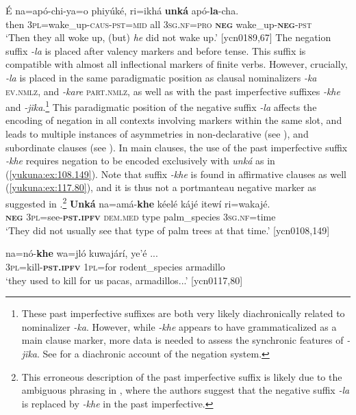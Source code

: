 \documentclass[output=paper,colorlinks,citecolor=brown]{langscibook}
\begin{document}
\ea\label{yukuna:ex:189.67a}
\gll  É na=apó-chi-ya=o phiyúké, ri=ikhá \textbf{unká} apó-\textbf{la}-cha. \\
then \textsc{3pl}=wake\_up-\textsc{caus}-\textsc{pst}=\textsc{mid} all \textsc{3sg.nf}=\textsc{pro} \textbf{\textsc{neg}} wake\_up-\textbf{\textsc{neg}}-\textsc{pst}\\
\glt ‘Then they all woke up, (but) \textit{he} did not wake up.’ [ycn0189,67]
\z
The negation suffix \textit{-la} is placed after valency markers and before tense. This suffix is compatible with almost all inflectional markers of finite verbs. However, crucially, \textit{-la} is placed in the same paradigmatic position as clausal nominalizers \textit{-ka} \textsc{ev.nmlz}, and \textit{-kare} \textsc{part.nmlz}, as well as with the past imperfective suffixes \textit{-khe} and \textit{-jĩka}.\footnote{These past imperfective suffixes are both very likely diachronically related to nominalizer \textit{-ka}. However, while \textit{-khe} appears to have grammaticalized as a main clause marker, more data is needed to assess the synchronic features of \textit{-jĩka}. See  for a diachronic account of the negation system.} This paradigmatic position of the negative suffix \textit{-la} affects the encoding of negation in all contexts involving markers within the same slot, and leads to multiple instances of asymmetries in non-declarative (see ), and subordinate clauses (see ). In main clauses, the use of the past imperfective suffix \textit{-khe} requires negation to be encoded exclusively with \textit{unká} as in (\ref{yukuna:ex:108.149}). Note that suffix \textit{-khe} is found in affirmative clauses as well (\ref{yukuna:ex:117.80}), and it is thus not a portmanteau negative marker as suggested in \citet[]{Michael2014}.\footnote{This erroneous description of the past imperfective suffix is likely due to the ambiguous phrasing in \citet[314]{SchauerEtAl2005}, where the authors suggest that the negative suffix \textit{-la} is replaced by \textit{-khe} in the past imperfective.}
\ea\label{yukuna:ex:108.149}
\gll  \textbf{Unká} na=amá-\textbf{khe} kéelé kájé itewí ri=wakajé.  \\
\textbf{\textsc{neg}} \textsc{3pl}=see-\textbf{\textsc{pst.ipfv}} \textsc{dem.med} type palm\_species \textsc{3sg.nf}=time\\ 
\glt ‘They did not usually see that type of palm trees at that time.’ [ycn0108,149]
\z

\ea\label{yukuna:ex:117.80}
\gll  na=nó-\textbf{khe} wa=jló kuwajárí,  ye'é {...} \\
\textsc{3pl}=kill-\textbf{\textsc{pst.ipfv}} \textsc{1pl}=for rodent\_species armadillo\\ 
\glt ‘they used to kill for us pacas, armadillos{...}’ [ycn0117,80]
\z
\end{document}
